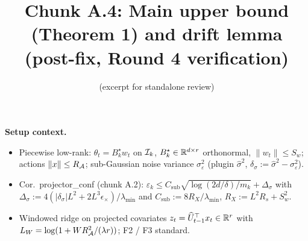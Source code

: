 

\title{Chunk A.4: Main upper bound (Theorem 1) and drift lemma\\(post-fix, Round 4 verification)}
\author{(excerpt for standalone review)}
\date{}


\maketitle

\textbf{Setup context.}
\begin{itemize}[leftmargin=*,itemsep=1pt,topsep=1pt]
\item Piecewise low-rank: $\theta_t=B_k^\star w_t$ on $\mathcal{I}_k$,
$B_k^\star\in\mathbb{R}^{d\times r}$ orthonormal, $\|w_t\|\le S_w$; actions
$\|x\|\le R_{\mathcal{A}}$; sub-Gaussian noise variance $\sigma_\varepsilon^2$
(plugin $\hat\sigma^2$, $\delta_\sigma:=\hat\sigma^2-\sigma_\varepsilon^2$).
\item Cor.\ projector\_conf (chunk A.2):
$\varepsilon_k\le C_{\mathrm{sub}}\sqrt{\log(2d/\delta)/m_k}+\Delta_\sigma$
with $\Delta_\sigma := 4(|\delta_\sigma|L^2+2L^3\epsilon_\times)/\lambda_{\min}$
and $C_{\mathrm{sub}}:=8R_X/\lambda_{\min}$, $R_X:=L^2 R_s+S_w^2$.
\item Windowed ridge on projected covariates $z_t=\widehat U_{t-1}^\top x_t\in\mathbb{R}^r$
with $L_W=\log(1+WR_{\mathcal{A}}^2/(\lambda r))$; F2 / F3 standard.
\end{itemize}

